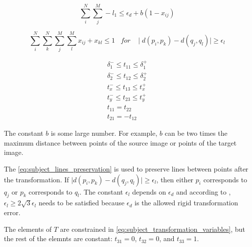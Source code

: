         \begin{equation}
            \label{eq:subject_transformation_negative_1}
            \sum_{i}^{N} \sum_{j}^{M} -l_{1} \leq \epsilon_d + b (1 - x_{ij})
        \end{equation}

        \begin{equation}
            \label{eq:subject_lines_preservation}
            \sum_{i}^{N} \sum_{k}^{N} \sum_{j}^{M} \sum_{l}^{M} x_{ij} + x_{kl} \leq 1 \;\;\; for \;\;\; \mid d(p_i, p_k) - d(q_j, q_l) \mid \geq \epsilon_l
        \end{equation}

        \begin{equation}
            \label{eq:subject_transformation_variables}
            \begin{gathered}
                \delta_1^- \leq t_{11} \leq \delta_1^+ \\
                \delta_2^- \leq t_{12} \leq \delta_2^+ \\
                t_x^- \leq t_{13} \leq t_x^+ \\
                t_y^- \leq t_{23} \leq t_y^+ \\
                t_{11} = t_{22} \\
                t_{21} = -t_{12}
            \end{gathered}
        \end{equation}
        

        The constant $b$ is some large number. For example, $b$ can be two times the maximum distance between points of the source image
        or points of the target image.

        The \autoref{eq:subject_lines_preservation} is used to preserve lines between points after the transformation.
        If $\mid d(p_i, p_k) - d(q_j, q_l) \mid \geq \epsilon_l$, then either $p_i$ corresponds to $q_j$ or $p_k$ corresponds to $q_l$.
        The constant $\epsilon_l$ depends on $\epsilon_d$ and according to \cite{Sakakubara_2007_automatic}, 
        $\epsilon_l \geq 2 \sqrt{3} \epsilon_l$ needs to be satisfied because $\epsilon_d$ is the allowed rigid transformation error.

        The elements of $T$ are constrained in \autoref{eq:subject_transformation_variables},
        but the rest of the elemnts are constant: $t_{31} = 0$, $t_{32} = 0$, and $t_{33} = 1$.
          

